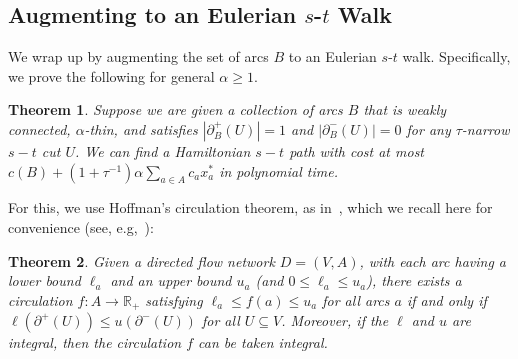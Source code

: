 \documentclass[11pt]{article}
\newtheorem{theorem}{Theorem}[section]
\theoremstyle{definition}
\def\A{{B}}
\def\Re{{\mathbb R}}
\begin{document}
\subsection{Augmenting to an Eulerian $s$-$t$ Walk}

We wrap up by augmenting the set of arcs $\A$ to an Eulerian $s$-$t$ walk.
Specifically, we prove the following for general $\alpha \geq 1$.
\begin{theorem}\label{thm:augment}
Suppose we are given a collection of arcs $\A$ that is weakly connected, $\alpha$-thin, and satisfies
$|\partial_{\A}^+(U)| = 1$ and $|\partial_{\A}^-(U)| = 0$ for any $\tau$-narrow $s-t$ cut $U$.
We can find a Hamiltonian $s-t$ path with cost at most
$c(\A) +  (1+\tau^{-1}) \alpha  \sum_{a \in A} c_a x^*_a$ in polynomial time.
\end{theorem}

For this, we use Hoffman's circulation theorem, as
in~\cite{AGMSS}, which we recall here for convenience (see,
e.g,~\cite[Theorem~11.2]{Schrijver-book}):
\begin{theorem}
  \label{thm:hoffman}
  Given a directed flow network $D = (V,A)$, with each arc having a
  lower bound $\ell_a$ and an upper bound $u_a$ (and $0 \leq \ell_a \leq
  u_a$), there exists a circulation $f: A \to \Re_+$ satisfying $\ell_a
  \leq f(a) \leq u_a$ for all arcs $a$ if and only if
  $\ell(\partial^+(U)) \leq u(\partial^-(U))$ for all $U \subseteq V$.
  Moreover, if the $\ell$ and $u$ are integral, then the circulation $f$
  can be taken integral.
\end{theorem}
\end{document}
